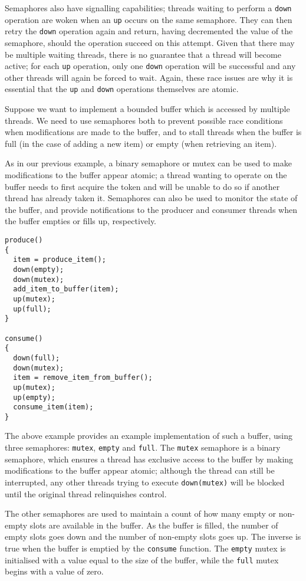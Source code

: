 Semaphores also have signalling capabilities; threads waiting to
perform a \texttt{down} operation are woken when an \texttt{up} occurs
on the same semaphore.  They can then retry the \texttt{down}
operation again and return, having decremented the value of the
semaphore, should the operation succeed on this attempt.  Given that
there may be multiple waiting threads, there is no guarantee that a
thread will become active; for each \texttt{up} operation, only one
\texttt{down} operation will be successful and any other threads will
again be forced to wait.  Again, these race issues are why it is
essential that the \texttt{up} and \texttt{down} operations themselves
are atomic.

Suppose we want to implement a bounded buffer which is accessed by
multiple threads.  We need to use semaphores both to prevent possible
race conditions when modifications are made to the buffer, and to
stall threads when the buffer is full (in the case of adding a new
item) or empty (when retrieving an item).

As in our previous example, a binary semaphore or mutex can be used to
make modifications to the buffer appear atomic; a thread wanting to
operate on the buffer needs to first acquire the token and will be
unable to do so if another thread has already taken it.  Semaphores
can also be used to monitor the state of the buffer, and provide
notifications to the producer and consumer threads when the buffer
empties or fills up, respectively.

\begin{verbatim}
produce()
{
  item = produce_item();
  down(empty);
  down(mutex);
  add_item_to_buffer(item);
  up(mutex);
  up(full);
}

consume()
{
  down(full);
  down(mutex);
  item = remove_item_from_buffer();
  up(mutex);
  up(empty);
  consume_item(item);
}
\end{verbatim}

The above example provides an example implementation of such a buffer,
using three semaphores: \texttt{mutex}, \texttt{empty} and
\texttt{full}.  The \texttt{mutex} semaphore is a binary semaphore,
which ensures a thread has exclusive access to the buffer by making
modifications to the buffer appear atomic; although the thread can
still be interrupted, any other threads trying to execute
\texttt{down(mutex)} will be blocked until the original thread
relinquishes control.

The other semaphores are used to maintain a count of how many empty or
non-empty slots are available in the buffer.  As the buffer is filled,
the number of empty slots goes down and the number of non-empty slots
goes up.  The inverse is true when the buffer is emptied by the
\texttt{consume} function.  The \texttt{empty} mutex is initialised
with a value equal to the size of the buffer, while the \texttt{full}
mutex begins with a value of zero.

